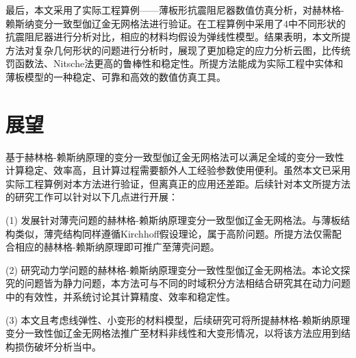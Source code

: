 最后，本文采用了实际工程算例——薄板形抗震阻尼器数值仿真分析，对赫林格-赖斯纳变分一致型伽辽金无网格法进行验证。在工程算例中采用了4中不同形状的抗震阻尼器进行分析对比，相应的材料均假设为弹线性模型。结果表明，本文所提方法对复杂几何形状的问题进行分析时，展现了更加稳定的应力分析云图，比传统罚函数法、Nitsche法更高的鲁棒性和稳定性。所提方法能成为实际工程中实体和薄板模型的一种稳定、可靠和高效的数值仿真工具。

\section{展望}
基于赫林格-赖斯纳原理的变分一致型伽辽金无网格法可以满足全域的变分一致性计算稳定、效率高，且计算过程需要额外人工经验参数使用便利。虽然本文已采用实际工程算例对本方法进行验证，但离真正的应用还差距。后续针对本文所提方法的研究工作可以针对以下几点进行开展：

(1) 发展针对薄壳问题的赫林格-赖斯纳原理变分一致型伽辽金无网格法。与薄板结构类似，薄壳结构同样遵循Kirchhoff假设理论，属于高阶问题。所提方法仅需配合相应的赫林格-赖斯纳原理即可推广至薄壳问题。

(2) 研究动力学问题的赫林格-赖斯纳原理变分一致性型伽辽金无网格法。本论文探究的问题皆为静力问题，本方法可与不同的时域积分方法相结合研究其在动力问题中的有效性，并系统讨论其计算精度、效率和稳定性。

(3) 本文且考虑线弹性、小变形的材料模型，后续研究可将所提赫林格-赖斯纳原理变分一致性伽辽金无网格法推广至材料非线性和大变形情况，以将该方法应用到结构损伤破坏分析当中。
